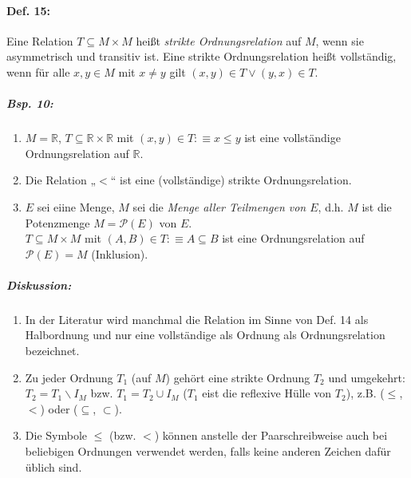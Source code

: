 \paragraph{Def. 15:} \parskp
Eine Relation $T\subseteq M \times M$ heißt \emph{strikte Ordnungsrelation} auf $M$, wenn sie asymmetrisch und transitiv ist. Eine strikte Ordnungsrelation heißt vollständig, wenn für alle $x,y \in M$ mit $x\not = y$ gilt $(x,y) \in T \vee (y,x) \in T$.

\subparagraph{Bsp. 10:}
\begin{enumerate} [label=\alph*)]
\item $M = \mathbb{R}$, $T\subseteq \mathbb{R} \times \mathbb{R}$ mit $\boxed{(x,y) \in T :\equiv x \leq y}$ ist eine vollständige Ordnungsrelation auf $\mathbb{R}$.
\item Die Relation „$<$“ ist eine (vollständige) strikte Ordnungsrelation.
\item $E$ sei eiine Menge, $M$ sei die \emph{Menge aller Teilmengen von $E$}, d.h. $M$ ist die Potenzmenge $M=\mathcal{P}(E)$ von $E$.\\
$T \subseteq M \times M$ mit $\boxed{(A,B)\in T :\equiv A \subseteq B}$ ist eine Ordnungsrelation auf $\mathcal{P}(E)=M$ (Inklusion).
\end{enumerate}

\subparagraph{Diskussion:}
\begin{enumerate}
\item In der Literatur wird manchmal die Relation im Sinne von Def. 14 als Halbordnung und nur eine vollständige als Ordnung als Ordnungsrelation bezeichnet.
\item Zu jeder Ordnung $T_1$ (auf $M$) gehört eine strikte Ordnung $T_2$ und umgekehrt: $T_2=T_1\backslash I_M$ bzw. $T_1=T_2 \cup I_M$ ($T_1$ eist die reflexive Hülle von $T_2$), z.B. ($\leq$, $<$) oder ($\subseteq$, $\subset$).
\item Die Symbole $\leq$ (bzw. $<$) können anstelle der Paarschreibweise auch bei beliebigen Ordnungen verwendet werden, falls keine anderen Zeichen dafür üblich sind.
\end{enumerate}

